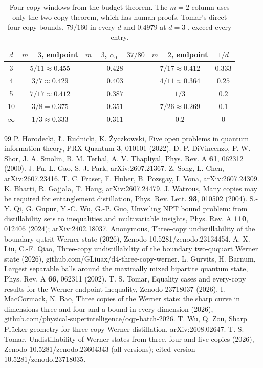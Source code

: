 \documentclass[11pt]{article}
\theoremstyle{remark}
\begin{document}
\begin{table}[h]
\centering
\begin{tabular}{ccccc}
\toprule
$d$ & $m=3$, endpoint & $m=3$, $\alpha_0=37/80$ & $m=2$, endpoint & $1/d$\\
\midrule
3 & $5/11\approx0.455$ & $0.428$ & $7/17\approx0.412$ & $0.333$\\
4 & $3/7\approx0.429$ & $0.403$ & $4/11\approx0.364$ & $0.25$\\
5 & $7/17\approx0.412$ & $0.387$ & $1/3$ & $0.2$\\
10 & $3/8=0.375$ & $0.351$ & $7/26\approx0.269$ & $0.1$\\
$\infty$ & $1/3\approx0.333$ & $0.311$ & $0.2$ & $0$\\
\bottomrule
\end{tabular}
\caption{Four-copy windows from the budget theorem. The $m=2$ column uses only the two-copy theorem, which has human
proofs. Tomar's direct four-copy bounds, $79/160$ in every $d$ and $0.4979$ at $d=3$ \cite{Tomar}, exceed every entry.}
\end{table}

\begin{thebibliography}{99}
 P. Horodecki, \L. Rudnicki, K. \.Zyczkowski, Five open problems in quantum information theory, PRX Quantum \textbf{3}, 010101 (2022).
 D. P. DiVincenzo, P. W. Shor, J. A. Smolin, B. M. Terhal, A. V. Thapliyal, Phys. Rev. A \textbf{61}, 062312 (2000).
 J. Fu, L. Gao, S.-J. Park, arXiv:2607.21367.
 Z. Song, L. Chen, arXiv:2607.23416.
 T. C. Fraser, F. Huber, B. Pozsgay, I. Vona, arXiv:2607.24309.
 K. Bharti, R. Gajjala, T. Haug, arXiv:2607.24479.
 J. Watrous, Many copies may be required for entanglement distillation, Phys. Rev. Lett. \textbf{93}, 010502 (2004).
 S.-Y. Qi, G. Gupur, Y.-C. Wu, G.-P. Guo, Unveiling NPT bound problem: from distillability sets to inequalities and multivariable insights, Phys. Rev. A \textbf{110}, 012406 (2024); arXiv:2402.18037.
 Anonymous, Three-copy undistillability of the boundary qutrit Werner state (2026), Zenodo 10.5281/zenodo.23134454.
 A.-X. Liu, C.-F. Qiao, Three-copy undistillability of the boundary two-ququart Werner state (2026), github.com/GLiuax/d4-three-copy-werner.
 L. Gurvits, H. Barnum, Largest separable balls around the maximally mixed bipartite quantum state, Phys. Rev. A \textbf{66}, 062311 (2002).
 T. S. Tomar, Equality cases and every-copy results for the Werner endpoint inequality, Zenodo 23718037 (2026).
 I. MacCormack, N. Bao, Three copies of the Werner state: the sharp curve in dimensions three and four and a bound in every dimension (2026), github.com/physical-superintelligence/oqp-batch-2026.
 T. Wu, Q. Zou, Sharp Pl\"ucker geometry for three-copy Werner distillation, arXiv:2608.02647.
 T. S. Tomar, Undistillability of Werner states from three, four and five copies (2026), Zenodo
10.5281/zenodo.23604343 (all versions); cited version 10.5281/zenodo.23718035.
\end{thebibliography}
\end{document}

